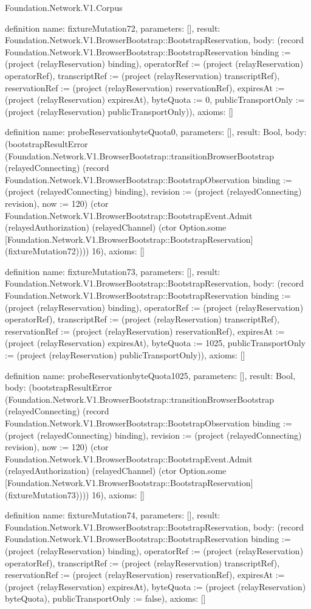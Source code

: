 \begin{lexlean}{Foundation.Network.V1.Corpus}
\begin{semanticmodule}
definition{
  name: fixtureMutation72,
  parameters: [],
  result: Foundation.Network.V1.BrowserBootstrap::BootstrapReservation,
  body: (record Foundation.Network.V1.BrowserBootstrap::BootstrapReservation {binding := (project (relayReservation) binding), operatorRef := (project (relayReservation) operatorRef), transcriptRef := (project (relayReservation) transcriptRef), reservationRef := (project (relayReservation) reservationRef), expiresAt := (project (relayReservation) expiresAt), byteQuota := 0, publicTransportOnly := (project (relayReservation) publicTransportOnly)}),
  axioms: []
}

definition{
  name: probeReservationbyteQuota0,
  parameters: [],
  result: Bool,
  body: (bootstrapResultError (Foundation.Network.V1.BrowserBootstrap::transitionBrowserBootstrap (relayedConnecting) (record Foundation.Network.V1.BrowserBootstrap::BootstrapObservation {binding := (project (relayedConnecting) binding), revision := (project (relayedConnecting) revision), now := 120}) (ctor Foundation.Network.V1.BrowserBootstrap::BootstrapEvent.Admit (relayedAuthorization) (relayedChannel) (ctor Option.some [Foundation.Network.V1.BrowserBootstrap::BootstrapReservation] (fixtureMutation72)))) 16),
  axioms: []
}

definition{
  name: fixtureMutation73,
  parameters: [],
  result: Foundation.Network.V1.BrowserBootstrap::BootstrapReservation,
  body: (record Foundation.Network.V1.BrowserBootstrap::BootstrapReservation {binding := (project (relayReservation) binding), operatorRef := (project (relayReservation) operatorRef), transcriptRef := (project (relayReservation) transcriptRef), reservationRef := (project (relayReservation) reservationRef), expiresAt := (project (relayReservation) expiresAt), byteQuota := 1025, publicTransportOnly := (project (relayReservation) publicTransportOnly)}),
  axioms: []
}

definition{
  name: probeReservationbyteQuota1025,
  parameters: [],
  result: Bool,
  body: (bootstrapResultError (Foundation.Network.V1.BrowserBootstrap::transitionBrowserBootstrap (relayedConnecting) (record Foundation.Network.V1.BrowserBootstrap::BootstrapObservation {binding := (project (relayedConnecting) binding), revision := (project (relayedConnecting) revision), now := 120}) (ctor Foundation.Network.V1.BrowserBootstrap::BootstrapEvent.Admit (relayedAuthorization) (relayedChannel) (ctor Option.some [Foundation.Network.V1.BrowserBootstrap::BootstrapReservation] (fixtureMutation73)))) 16),
  axioms: []
}

definition{
  name: fixtureMutation74,
  parameters: [],
  result: Foundation.Network.V1.BrowserBootstrap::BootstrapReservation,
  body: (record Foundation.Network.V1.BrowserBootstrap::BootstrapReservation {binding := (project (relayReservation) binding), operatorRef := (project (relayReservation) operatorRef), transcriptRef := (project (relayReservation) transcriptRef), reservationRef := (project (relayReservation) reservationRef), expiresAt := (project (relayReservation) expiresAt), byteQuota := (project (relayReservation) byteQuota), publicTransportOnly := false}),
  axioms: []
}


\end{semanticmodule}
\end{lexlean}
